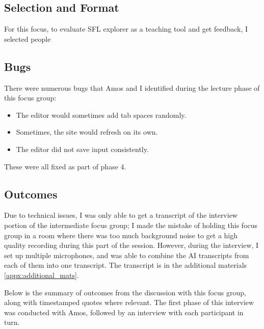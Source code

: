 \subsection{Selection and Format}
For this focus, to evaluate SFL explorer as a teaching tool and get feedback, I selected people 

\subsection{Bugs}
There were numerous bugs that Amos and I identified during the lecture phase of this focus group:
\begin{itemize}
    \item The editor would sometimes add tab spaces randomly.
    \item Sometimes, the site would refresh on its own.
    \item The editor did not save input consistently.
\end{itemize}
\noindent These were all fixed as part of phase 4.

\subsection{Outcomes}
Due to technical issues, I was only able to get a transcript of the interview portion of the intermediate focus group; I made the mistake of holding this focus group in a room where there was too much background noise to get a high quality recording during this part of the session. However, during the interview, I set up multiple microphones, and was able to combine the AI transcripts from each of them into one transcript. The transcript is in the additional materials \ref{appx:additional_mats}. 

Below is the summary of outcomes from the discussion with this focus group, along with timestamped quotes where relevant. The first phase of this interview was conducted with Amos, followed by an interview with each participant in turn. 


